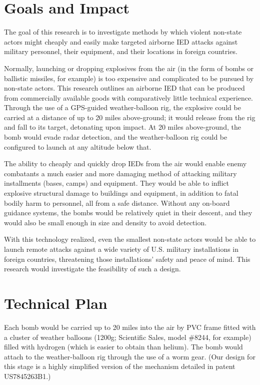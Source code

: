 \documentclass[12pt]{article}
\begin{document}
\section{Goals and Impact}

The goal of this research is to investigate methods by which violent non-state actors might cheaply and easily make targeted airborne IED attacks against military personnel, their equipment, and their locations in foreign countries.

Normally, launching or dropping explosives from the air (in the form of bombs or ballistic missiles, for example) is too expensive and complicated to be pursued by non-state actors. This research outlines an airborne IED that can be produced from commercially available goods with comparatively little technical experience. Through the use of a GPS-guided weather-balloon rig, the explosive could be carried at a distance of up to 20 miles above-ground; it would release from the rig and fall to its target, detonating upon impact. At 20 miles above-ground, the bomb would evade radar detection, and the weather-balloon rig could be configured to launch at any altitude below that.

The ability to cheaply and quickly drop IEDs from the air would enable enemy combatants a much easier and more damaging method of attacking military installments (bases, camps) and equipment. They would be able to inflict explosive structural damage to buildings and equipment, in addition to fatal bodily harm to personnel, all from a safe distance. Without any on-board guidance systems, the bombs would be relatively quiet in their descent, and they would also be small enough in size and density to avoid detection.

With this technology realized, even the smallest non-state actors would be able to launch remote attacks against a wide variety of U.S. military installations in foreign countries, threatening those installations' safety and peace of mind. This research would investigate the feasibility of such a design.

\section{Technical Plan}

Each bomb would be carried up to 20 miles into the air by PVC frame fitted with a cluster of weather balloons (1200g; Scientific Sales, model \#8244, for example) filled with hydrogen (which is easier to obtain than helium). The bomb would attach to the weather-balloon rig through the use of a worm gear. (Our design for this stage is a highly simplified version of the mechanism detailed in patent US7845263B1.)
\end{document}
